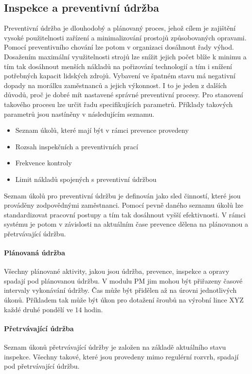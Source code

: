 \documentclass[thesis=M,czech]{FITthesis}[2012/06/26]
\begin{document}
\subsection{Inspekce a preventivní údržba}
Preventivní údržba je dlouhodobý a plánovaný proces, jehož cílem je zajištění vysoké použitelnosti zařízení a minimalizování prostojů způsobovaných opravami. Pomocí preventivního chování lze potom v organizaci dosáhnout řady výhod. Dosažením maximální využitelnosti strojů lze snížit jejich počet blíže k minimu a tím tak dosáhnout menších nákladů na pořizování technologií a tím i snížení potřebných kapacit lidských zdrojů. Vybavení ve špatném stavu má negativní dopady na morálku zaměstnanců a jejich výkonnost. I to je jeden z dalších důvodů, proč je dobré mít nastavené správné preventivní procesy. Pro stanovení takového procesu lze určit řadu specifikujících parametrů. Příklady takových parametrů jsou nastíněny v následujícím seznamu.
\begin{itemize}
	\item
	Seznam úkolů, které mají být v rámci prevence provedeny
	\item
	Rozsah inspekčních a preventivních prací
	\item
	Frekvence kontroly 
	\item
	Limit nákladů spojených s preventivní údržbou
\end{itemize} 	
Seznam úkolů pro preventivní údržbu je definován jako sled činností, které jsou prováděny zodpovědnými zaměstnanci. Pomocí pevně daného seznamu úkolů lze standardizovat pracovní postupy a tím tak dosáhnout vyšší efektivnosti. V rámci systému je potom v závislosti na aktuálním čase prevence dělena na plánovanou a přetrvávající údržbu.

\paragraph{Plánovaná údržba}
Všechny plánované aktivity, jakou jsou údržba, prevence, inspekce a opravy spadají pod plánovanou údržbu. V modulu PM jim mohou být přiřazeny časové intervaly vykonávání údržby. Čas může být přidělen až na úrovni jednotlivých úkonů. Příkladem tak může být úkon pro dotažení šroubů na výrobní lince XYZ každé druhé pondělí ve 14 hodin.

\paragraph{Přetrvávající údržba}
Seznam úkonů přetrvávající údržby je založen na základě aktuálního stavu inspekce. Všechny takové, které jsou provedeny mimo regulérní rozvrh, spadají pod přetrvávající údržbu.
\end{document}
